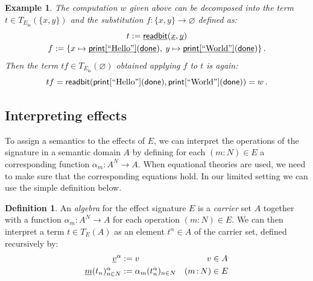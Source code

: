 \documentclass[11pt,oneside,draft]{book}
\newtheorem{example}[theorem]{Example}
\theoremstyle{definition}
\newtheorem{definition}[theorem]{Definition}
\newcommand{\kw}[1]{\ensuremath{ \mathsf{#1} }}
\newcommand{\ul}[1]{%
  \underline{\smash{#1}}
}
\begin{document}
\begin{example} %
The computation $w$ given above can be decomposed into
the term $t \in T_{E_\kw{io}}(\{x, y\})$ and
the substitution $f : \{x, y\} \rightarrow \varnothing$
defined as:
\begin{gather*}
  t := \ul{\kw{readbit}}(\ul{x}, \ul{y})
  \\
  f := \{
    x \mapsto \ul{\kw{print}[\text{\rm ``Hello''}]}(
                \ul{\kw{done}}), \:
    y \mapsto \ul{\kw{print}[\text{\rm ``World''}]}(
                \ul{\kw{done}})
  \}
  \,.
\end{gather*}
Then the term
$tf \in T_{E_\kw{io}}(\varnothing)$
obtained applying $f$ to $t$ is again:
\[
  t f =
    \kw{readbit}(
      \kw{print}[\text{\rm ``Hello''}](\kw{done}),
      \kw{print}[\text{\rm ``World''}](\kw{done}))
    = w
  \,.
\]
\end{example}


\subsection{Interpreting effects} %

To assign a semantics to the effects of $E$,
we can interpret the operations of the signature
in a semantic domain $A$
by defining for each $(m \mathop{:} N) \in E$
a corresponding function $\alpha_m : A^N \rightarrow A$.
When equational theories are used,
we need to make sure that the corresponding equations hold.
In our limited setting we can use the simple definition below.

\begin{definition} \label{def:algebra} %
An \emph{algebra}
for the effect signature $E$
is a \emph{carrier} set $A$
together with a function
$\alpha_m : A^N \rightarrow A$
for each operation $(m \mathop{:} N) \in E$.
We can then interpret
a term $t \in T_E(A)$
as an element $t^\alpha \in A$ of the carrier set,
defined recursively by:
\begin{align*}
  \ul{v}^\alpha &:= v & v &\in A \\
  \ul{m}(t_n)_{n \in N}^\alpha &:=
    \alpha_m(t_n^\alpha)_{n \in N} & (m \mathop{:} N) &\in E
\end{align*}
\end{definition}
\end{document}
